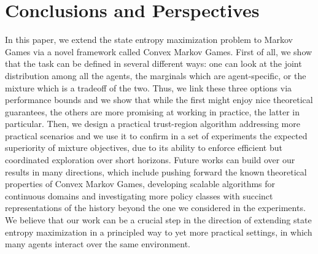 \section{Conclusions and Perspectives}
\label{sec:conclusions}

In this paper, we extend the state entropy maximization problem to Markov Games via a novel framework called Convex Markov Games. First of all, we show that the task can be defined in several different ways: one can look at the joint distribution among all the agents, the marginals which are agent-specific, or the mixture which is a tradeoff of the two. Thus, we link these three options via performance bounds and we show that while the first might enjoy nice theoretical guarantees, the others are more promising at working in practice, the latter in particular. Then, we design a practical trust-region algorithm addressing more practical scenarios and we use it to confirm in a set of experiments the expected superiority of mixture objectives, due to its ability to enforce efficient but coordinated exploration over short horizons. Future works can build over our results in many directions, which include pushing forward the known theoretical properties of Convex Markov Games, developing scalable algorithms for continuous domains and investigating more policy classes with succinct representations of the history beyond the one we considered in the experiments.
We believe that our work can be a crucial step in the direction of extending state entropy maximization in a principled way to yet more practical settings, in which many agents interact over the same environment.